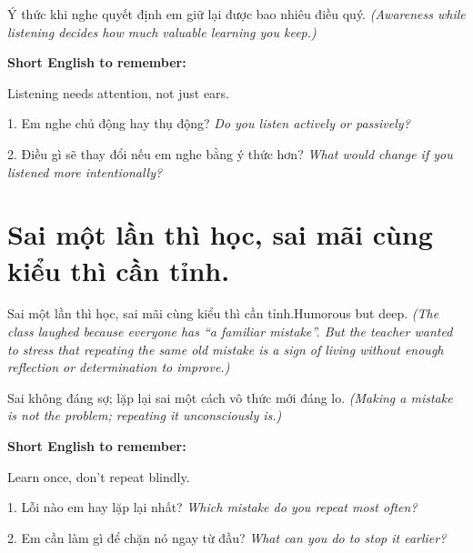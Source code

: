 \begin{baihoc}
Ý thức khi nghe quyết định em giữ lại được bao nhiêu điều quý.
\textit{(Awareness while listening decides how much valuable learning you keep.)}
\end{baihoc}

\begin{ghinhoanh}
\textbf{Short English to remember:}

Listening needs attention, not just ears.

\end{ghinhoanh}

\begin{tuhocnhanh}
1. Em nghe chủ động hay thụ động? \textit{Do you listen actively or passively?}

2. Điều gì sẽ thay đổi nếu em nghe bằng ý thức hơn? \textit{What would change if you listened more intentionally?}
\end{tuhocnhanh}
\ngancach

\section{Sai một lần thì học, sai mãi cùng kiểu thì cần tỉnh.}
\begin{truyen}{Sai một lần thì học, sai mãi cùng kiểu thì cần tỉnh.}{Humorous but deep.}
\textit{(The class laughed because everyone has “a familiar mistake”. But the teacher wanted to stress that repeating the same old mistake is a sign of living without enough reflection or determination to improve.)}
\end{truyen}

\begin{baihoc}
Sai không đáng sợ; lặp lại sai một cách vô thức mới đáng lo.
\textit{(Making a mistake is not the problem; repeating it unconsciously is.)}
\end{baihoc}

\begin{ghinhoanh}
\textbf{Short English to remember:}

Learn once, don't repeat blindly.

\end{ghinhoanh}

\begin{tuhocnhanh}
1. Lỗi nào em hay lặp lại nhất? \textit{Which mistake do you repeat most often?}

2. Em cần làm gì để chặn nó ngay từ đầu? \textit{What can you do to stop it earlier?}
\end{tuhocnhanh}
\ngancach

